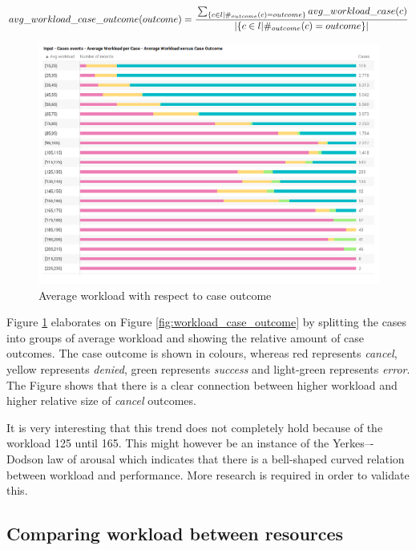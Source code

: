 \begin{equation}\label{def:workload_case_outcome}
     avg\_workload\_case\_outcome(outcome) = \cfrac{\sum_{\{c \in l | \#_{outcome}(c)=outcome\}} avg\_workload\_case(c) }{|\{c \in l | \#_{outcome}(c)=outcome\}|}
\end{equation}

\begin{figure}[h]
	\centering
    \includegraphics[width=\textwidth]{figures/workload_groups_case_outcome.png}
    \caption{Average workload with respect to case outcome}
    \label{fig:workload_groups_case_outcome}
\end{figure}

Figure \ref{fig:workload_groups_case_outcome} elaborates on Figure \ref{fig:workload_case_outcome} by splitting the cases into groups of average workload and showing the relative amount of case outcomes. The case outcome is shown in colours, whereas red represents \textit{cancel}, yellow represents \textit{denied}, green represents \textit{success} and light-green represents \textit{error}. The Figure shows that there is a clear connection between higher workload and higher relative size of \textit{cancel} outcomes.

It is very interesting that this trend does not completely hold because of the workload 125 until 165. This might however be an instance of the Yerkes–-Dodson law of arousal which indicates that there is a bell-shaped curved relation between workload and performance. More research is required in order to validate this.  

\subsection{Comparing workload between resources}

